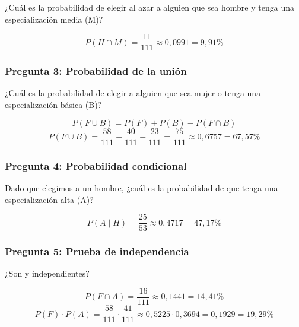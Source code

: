 ¿Cuál es la probabilidad de elegir al azar a alguien que sea hombre y tenga una especialización
media (M)?

\Respuesta
\[ P(H \cap M) = \frac{11}{111} \approx 0{,}0991 = 9{,}91\% \]



\subsubsection{Pregunta 3: Probabilidad de la unión}

¿Cuál es la probabilidad de elegir a alguien que sea mujer o tenga una especialización básica (B)?

\Respuesta
\[ P(F \cup B) = P(F) + P(B) - P(F \cap B) \]
\[ P(F \cup B) = \frac{58}{111} + \frac{40}{111} - \frac{23}{111} = \frac{75}{111} \approx 0{,}6757 = 67{,}57\% \]



\subsubsection{Pregunta 4: Probabilidad condicional}

Dado que elegimos a un hombre, ¿cuál es la probabilidad de que tenga una especialización alta (A)?

\Respuesta
\[ P(A \mid H) = \frac{25}{53} \approx 0{,}4717 = 47{,}17\% \]



\subsubsection{Pregunta 5: Prueba de independencia}

¿Son  y  independientes?

\Respuesta
\[ P(F \cap A) = \frac{16}{111} \approx 0{,}1441 = 14{,}41\% \]
\[ P(F) \cdot P(A) = \frac{58}{111} \cdot \frac{41}{111} \approx 0{,}5225 \cdot 0{,}3694 = 0{,}1929 = 19{,}29\% \]

